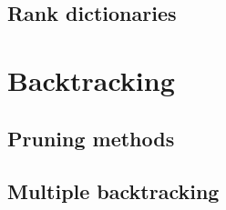 \subsection{Rank dictionaries}
\section{Backtracking}
\subsection{Pruning methods}
\subsection{Multiple backtracking}

